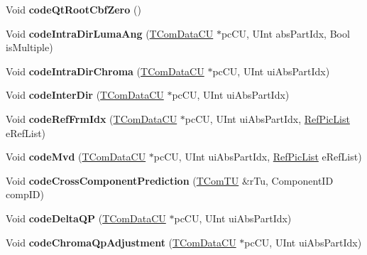 \begin{DoxyCompactItemize}
Void {\bfseries code\+Qt\+Root\+Cbf\+Zero} ()
\item 
\mbox{\label{class_t_enc_cavlc_ac4e9a840d83a518b4536a29f32a7e769}} 
Void {\bfseries code\+Intra\+Dir\+Luma\+Ang} (\hyperlink{class_t_com_data_c_u}{T\+Com\+Data\+CU} $\ast$pc\+CU, U\+Int abs\+Part\+Idx, Bool is\+Multiple)
\item 
\mbox{\label{class_t_enc_cavlc_ac8776f54313a0f81bf086856220e2c30}} 
Void {\bfseries code\+Intra\+Dir\+Chroma} (\hyperlink{class_t_com_data_c_u}{T\+Com\+Data\+CU} $\ast$pc\+CU, U\+Int ui\+Abs\+Part\+Idx)
\item 
\mbox{\label{class_t_enc_cavlc_a238401a7954b8daf1f8c62f69b6274f2}} 
Void {\bfseries code\+Inter\+Dir} (\hyperlink{class_t_com_data_c_u}{T\+Com\+Data\+CU} $\ast$pc\+CU, U\+Int ui\+Abs\+Part\+Idx)
\item 
\mbox{\label{class_t_enc_cavlc_a26e3cfb4ca97d00d0dcaebdf6584db88}} 
Void {\bfseries code\+Ref\+Frm\+Idx} (\hyperlink{class_t_com_data_c_u}{T\+Com\+Data\+CU} $\ast$pc\+CU, U\+Int ui\+Abs\+Part\+Idx, \hyperlink{_type_def_8h_a93cea48eb9dcfd661168dee82e41b384}{Ref\+Pic\+List} e\+Ref\+List)
\item 
\mbox{\label{class_t_enc_cavlc_ab654bc11b1918cc75a0299f06ca19e5e}} 
Void {\bfseries code\+Mvd} (\hyperlink{class_t_com_data_c_u}{T\+Com\+Data\+CU} $\ast$pc\+CU, U\+Int ui\+Abs\+Part\+Idx, \hyperlink{_type_def_8h_a93cea48eb9dcfd661168dee82e41b384}{Ref\+Pic\+List} e\+Ref\+List)
\item 
\mbox{\label{class_t_enc_cavlc_a6b86242d8dab1c663208a869135f537b}} 
Void {\bfseries code\+Cross\+Component\+Prediction} (\hyperlink{class_t_com_t_u}{T\+Com\+TU} \&r\+Tu, Component\+ID comp\+ID)
\item 
\mbox{\label{class_t_enc_cavlc_a4667b2e96f3be2b79f812c8c78d560a0}} 
Void {\bfseries code\+Delta\+QP} (\hyperlink{class_t_com_data_c_u}{T\+Com\+Data\+CU} $\ast$pc\+CU, U\+Int ui\+Abs\+Part\+Idx)
\item 
\mbox{\label{class_t_enc_cavlc_ac7f52cba4b03a509ffb20cb4a7734dfe}} 
Void {\bfseries code\+Chroma\+Qp\+Adjustment} (\hyperlink{class_t_com_data_c_u}{T\+Com\+Data\+CU} $\ast$pc\+CU, U\+Int ui\+Abs\+Part\+Idx)

\end{DoxyCompactItemize}
